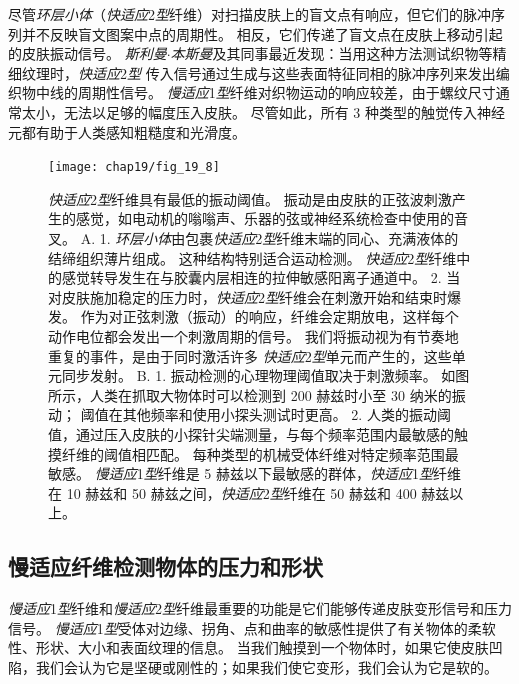 尽管\textit{环层小体}（\textit{快适应}2\textit{型}纤维）对扫描皮肤上的盲文点有响应，但它们的脉冲序列并不反映盲文图案中点的周期性。
相反，它们传递了盲文点在皮肤上移动引起的皮肤振动信号。
\textit{斯利曼$\cdot$本斯曼}及其同事最近发现：当用这种方法测试织物等精细纹理时，\textit{快适应}2\textit{型} 传入信号通过生成与这些表面特征同相的脉冲序列来发出编织物中线的周期性信号。
\textit{慢适应}1\textit{型}纤维对织物运动的响应较差，由于螺纹尺寸通常太小，无法以足够的幅度压入皮肤。
尽管如此，所有 3 种类型的触觉传入神经元都有助于人类感知粗糙度和光滑度。


\begin{figure}[htbp]
	\centering
	\texttt{[image: chap19/fig\_19\_8]}
	\caption{\textit{快适应}2\textit{型}纤维具有最低的振动阈值。
		振动是由皮肤的正弦波刺激产生的感觉，如电动机的嗡嗡声、乐器的弦或神经系统检查中使用的音叉。
		A. 1. \textit{环层小体}由包裹\textit{快适应}2\textit{型}纤维末端的同心、充满液体的结缔组织薄片组成。
		这种结构特别适合运动检测。
		\textit{快适应}2\textit{型}纤维中的感觉转导发生在与胶囊内层相连的拉伸敏感阳离子通道中。
		2. 当对皮肤施加稳定的压力时，\textit{快适应}2\textit{型}纤维会在刺激开始和结束时爆发。
		作为对正弦刺激（振动）的响应，纤维会定期放电，这样每个动作电位都会发出一个刺激周期的信号。
		我们将振动视为有节奏地重复的事件，是由于同时激活许多 \textit{快适应}2\textit{型}单元而产生的，这些单元同步发射\cite{talbot1968sense}。
		B. 1. 振动检测的心理物理阈值取决于刺激频率。
		如图所示，人类在抓取大物体时可以检测到 200 赫兹时小至 30 纳米的振动；
		阈值在其他频率和使用小探头测试时更高\cite{brisben1999detection}。
		2. 人类的振动阈值，通过压入皮肤的小探针尖端测量，与每个频率范围内最敏感的触摸纤维的阈值相匹配。 
		每种类型的机械受体纤维对特定频率范围最敏感。
		\textit{慢适应}1\textit{型}纤维是 5 赫兹以下最敏感的群体，\textit{快适应}1\textit{型}纤维在 10 赫兹和 50 赫兹之间，\textit{快适应}2\textit{型}纤维在 50 赫兹和 400 赫兹以上\cite{mountcastle1972detection,johansson1982responses}。}
	\label{fig:19_8}
\end{figure}



\subsection{慢适应纤维检测物体的压力和形状}

\textit{慢适应}1\textit{型}纤维和\textit{慢适应}2\textit{型}纤维最重要的功能是它们能够传递皮肤变形信号和压力信号。
\textit{慢适应}1\textit{型}受体对边缘、拐角、点和曲率的敏感性提供了有关物体的柔软性、形状、大小和表面纹理的信息。
当我们触摸到一个物体时，如果它使皮肤凹陷，我们会认为它是坚硬或刚性的；如果我们使它变形，我们会认为它是软的。


